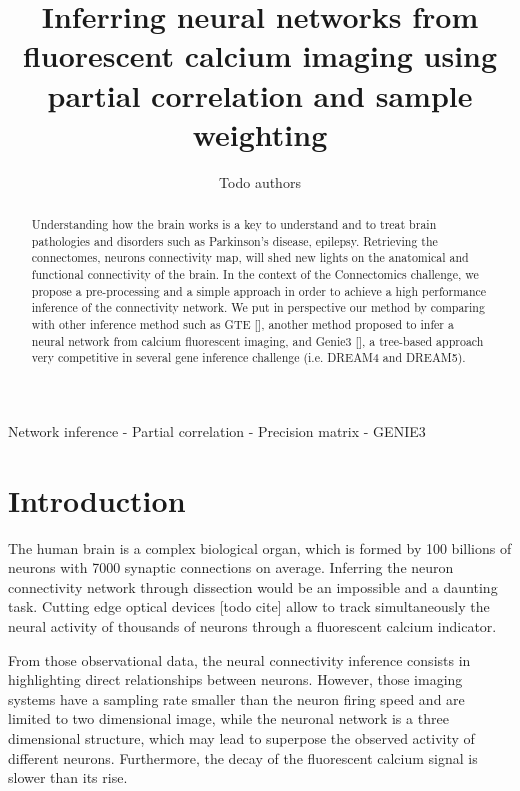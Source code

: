 \documentclass[wcp]{jmlr}
\title[Connectomics challenge]{Inferring neural networks from fluorescent
                               calcium imaging using partial correlation and
                               sample weighting}
\author{Todo authors}
\begin{document}
\maketitle


\begin{abstract}
Understanding how the brain works is a key to understand and to treat
brain pathologies and disorders such as Parkinson's disease, epilepsy.
Retrieving the connectomes, neurons connectivity map, will shed new lights on
the anatomical and functional connectivity of the brain.
In the context of the Connectomics challenge, we propose a pre-processing and
a simple approach in order to achieve a high performance inference of the
connectivity network.
We put in perspective our method by comparing with other inference method such
as GTE [], another method proposed to infer a neural network from calcium
fluorescent imaging, and Genie3 [], a tree-based approach very competitive
in several gene inference challenge (i.e. DREAM4 and DREAM5).


\end{abstract}

\begin{keywords}
Network inference - Partial correlation - Precision matrix - GENIE3
\end{keywords}


\section{Introduction}\label{sec:intro}

The human brain is a complex biological organ, which is formed by 100
billions of neurons with 7000 synaptic connections on average. Inferring the
neuron connectivity network through dissection would be an impossible
and a daunting task. Cutting edge optical devices [todo cite] allow to track
simultaneously the neural activity of thousands of neurons through a fluorescent
calcium indicator.

From those observational data, the neural connectivity inference consists in
highlighting direct relationships between neurons. However, those imaging
systems have a sampling rate smaller than the neuron firing speed and are
limited to two dimensional image, while the neuronal network is a
three dimensional structure, which may lead to superpose the observed activity
of different neurons. Furthermore, the decay of the fluorescent calcium signal
is slower than its rise.
\end{document}
